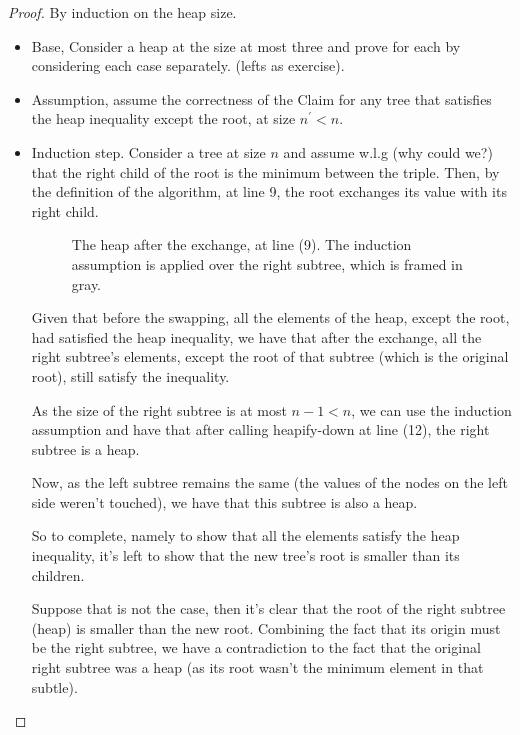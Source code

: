 \begin{proof}
  
By induction on the heap size.  
 
\begin{itemize} 
  \item Base, Consider a heap at the size at most three and prove for each by considering each case separately. (lefts as exercise).  
  \item Assumption, assume the correctness of the Claim for any tree that satisfies the heap inequality except the root, at size $n^{\prime} < n$. 
  \item Induction step. Consider a tree at size $n$ and assume w.l.g (why could we?) that the right child of the root is the minimum between the triple. Then, by the definition of the algorithm, at line 9, the root exchanges its value with its right child.

    \begin{figure}[h]
      \centering
      
      \caption{The heap after the exchange, at line (9). The induction assumption is applied over the right subtree, which is framed in gray.}
      \label{fig:<+label+>}
    \end{figure}

    Given that before the swapping, all the elements of the heap, except the root, had satisfied the heap inequality, we have that after the exchange, all the right subtree's elements, except the root of that subtree (which is the original root), still satisfy the inequality.

    As the size of the right subtree is at most $n-1 < n$, we can use the induction assumption and have that after calling heapify-down at line (12), the right subtree is a heap.

    Now, as the left subtree remains the same (the values of the nodes on the left side weren't touched), we have that this subtree is also a heap.

    So to complete, namely to show that all the elements satisfy the heap inequality, it's left to show that the new tree's root is smaller than its children.

    Suppose that is not the case, then it's clear that the root of the right subtree (heap) is smaller than the new root. Combining the fact that its origin must be the right subtree, we have a contradiction to the fact that the original right subtree was a heap (as its root wasn't the minimum element in that subtle).  
 
\end{itemize} 
 \end{proof}






